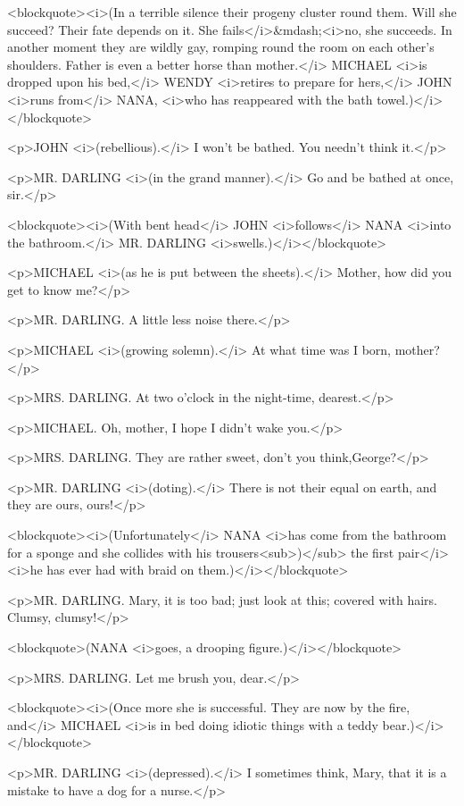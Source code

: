 <blockquote><i>(In a terrible silence their progeny cluster round them. Will she succeed? Their fate depends on it. She fails</i>&mdash;<i>no, she succeeds. In another moment they are wildly gay, romping round the room on each other's shoulders. Father is even a better horse than mother.</i> MICHAEL <i>is dropped upon his bed,</i> WENDY <i>retires to prepare for hers,</i> JOHN <i>runs from</i> NANA, <i>who has reappeared with the bath towel.)</i></blockquote>

<p>JOHN <i>(rebellious).</i> I won't be bathed. You needn't think it.</p>

<p>MR. DARLING <i>(in the grand manner).</i> Go and be bathed at once, sir.</p>

<blockquote><i>(With bent head</i> JOHN <i>follows</i> NANA <i>into the bathroom.</i> MR. DARLING <i>swells.)</i></blockquote>

<p>MICHAEL <i>(as he is put between the sheets).</i> Mother, how did you get to know me?</p>

<p>MR. DARLING. A little less noise there.</p>

<p>MICHAEL <i>(growing solemn).</i> At what time was I born, mother?</p>

<p>MRS. DARLING. At two o'clock in the night-time, dearest.</p>

<p>MICHAEL. Oh, mother, I hope I didn't wake you.</p>

<p>MRS. DARLING. They are rather sweet, don't you think,George?</p>

<p>MR. DARLING <i>(doting).</i> There is not their equal on earth, and they are ours, ours!</p>

<blockquote><i>(Unfortunately</i> NANA <i>has come from the bathroom for a sponge and she collides with his trousers<sub>)</sub> the first pair</i> <i>he has ever had with braid on them.)</i></blockquote>

<p>MR. DARLING. Mary, it is too bad; just look at this; covered with hairs. Clumsy, clumsy!</p>

<blockquote>(NANA <i>goes, a drooping figure.)</i></blockquote>

<p>MRS. DARLING. Let me brush you, dear.</p>

<blockquote><i>(Once more she is successful. They are now by the fire, and</i> MICHAEL <i>is in bed doing idiotic things with a teddy bear.)</i></blockquote>

<p>MR. DARLING <i>(depressed).</i> I sometimes think, Mary, that it is a mistake to have a dog for a nurse.</p>

